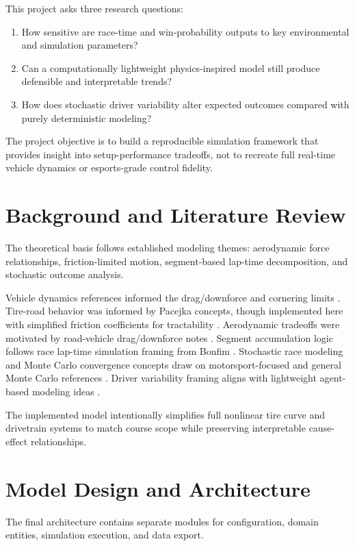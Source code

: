 \documentclass[12pt]{article}
\begin{document}
This project asks three research questions:
\begin{enumerate}
    \item How sensitive are race-time and win-probability outputs to key environmental and simulation parameters?
    \item Can a computationally lightweight physics-inspired model still produce defensible and interpretable trends?
    \item How does stochastic driver variability alter expected outcomes compared with purely deterministic modeling?
\end{enumerate}

The project objective is to build a reproducible simulation framework that provides insight into setup-performance tradeoffs, not to recreate full real-time vehicle dynamics or esports-grade control fidelity.

\section{Background and Literature Review}
The theoretical basis follows established modeling themes: aerodynamic force relationships, friction-limited motion, segment-based lap-time decomposition, and stochastic outcome analysis.

Vehicle dynamics references informed the drag/downforce and cornering limits \cite{ucsd_vehicle_dynamics}. Tire-road behavior was informed by Pacejka concepts, though implemented here with simplified friction coefficients for tractability \cite{pacejka}. Aerodynamic tradeoffs were motivated by road-vehicle drag/downforce notes \cite{mcgann_drag}. Segment accumulation logic follows race lap-time simulation framing from Bonfim \cite{bonfim_thesis}. Stochastic race modeling and Monte Carlo convergence concepts draw on motorsport-focused and general Monte Carlo references \cite{sulsters_f1,kroese_mc}. Driver variability framing aligns with lightweight agent-based modeling ideas \cite{wilensky_abm}.

The implemented model intentionally simplifies full nonlinear tire curve and drivetrain systems to match course scope while preserving interpretable cause-effect relationships.

\section{Model Design and Architecture}
The final architecture contains separate modules for configuration, domain entities, simulation execution, and data export.
\end{document}
